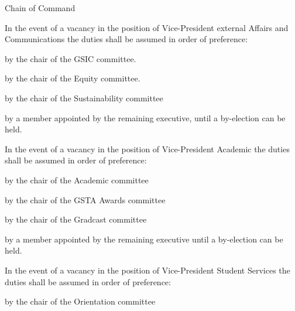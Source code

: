 \begin{longenum}[ label*=\thesubsection.\arabic*., align=left]
	\item Chain of Command 
		\begin{longenum}[ label*=\arabic*., align=left]
			\item In the event of a vacancy in the position of Vice-President external Affairs and Communications the duties shall be assumed in order of preference:
			\begin{longenum}[ label*=\arabic*., align=left]
				\item by the chair of the GSIC committee.
				\item by the chair of the Equity committee.
                \item by the chair of the Sustainability committee
				\item by a member appointed by the remaining executive, until a by-election can be held.
			\end{longenum}
			\item In the event of a vacancy in the position of Vice-President Academic the duties shall be assumed in order of preference:
			\begin{longenum}[ label*=\arabic*., align=left]
				\item by the chair of the Academic committee
				\item by the chair of the GSTA Awards committee
				\item by the chair of the Gradcast committee
				\item by a member appointed by the remaining executive until a by-election can be held.
			\end{longenum}
			\item In the event of a vacancy in the position of Vice-President Student Services the duties shall be assumed in order of preference: 
			\begin{longenum}[ label*=\arabic*., align=left]
				\item by the chair of the Orientation committee

\end{longenum}
\end{longenum}
\end{longenum}
